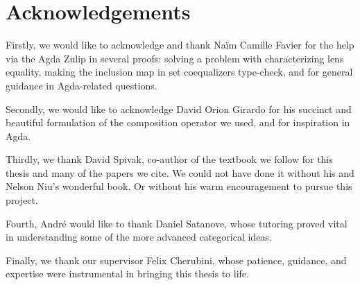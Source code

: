 \thispagestyle{plain}			%
\section*{Acknowledgements}
Firstly, we would like to acknowledge and thank Naïm Camille Favier for the help via the Agda Zulip in several proofs: solving a problem with characterizing lens equality, making the inclusion map in set coequalizers type-check, and for general guidance in Agda-related questions.


Secondly, we would like to acknowledge David Orion Girardo for his succinct and beautiful formulation of the composition operator we used, and for inspiration in Agda.


Thirdly, we thank David Spivak, co-author of the textbook we follow for this thesis and many of the papers we cite. We could not have done it without his and Nelson Niu's wonderful book. Or without his warm encouragement to pursue this project.

Fourth, André would like to thank Daniel Satanove, whose tutoring proved vital in understanding some of the more advanced categorical ideas.

Finally, we thank our supervisor Felix Cherubini, whose patience, guidance, and expertise were instrumental in bringing this thesis to life.


\newpage				%
\thispagestyle{empty}
\mbox{}